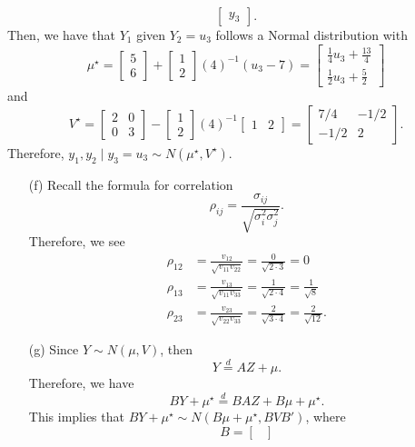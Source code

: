 \documentclass[11pt]{article}
\begin{document}
\begin{itemize}
\begin{itemize}
\[\begin{bmatrix}
y_3
\end{bmatrix}.
\]
Then, we have that $Y_1$ given $Y_2 = u_3$ follows a Normal distribution with
\[
\mu^\star = \begin{bmatrix}
5 \\ 6
\end{bmatrix} + \begin{bmatrix}
1 \\ 2
\end{bmatrix}(4)^{-1}(u_3 - 7) = \begin{bmatrix}
\frac{1}{4}u_3 + \frac{13}{4} \\
\frac{1}{2}u_3 + \frac{5}{2}
\end{bmatrix}
\]
and
\[
V^\star = \begin{bmatrix}
2 & 0 \\
0 & 3
\end{bmatrix} - \begin{bmatrix}
1 \\ 2
\end{bmatrix}(4)^{-1}\begin{bmatrix}
1 & 2
\end{bmatrix} = \begin{bmatrix}
7/4 & -1/2 \\
-1/2 & 2
\end{bmatrix}.
\]
Therefore, $y_1,y_2 \mid y_3 = u_3 \sim N(\mu^\star, V^\star)$.
\end{itemize}
\begin{itemize}
\item[(f)]  Recall the formula for correlation
\[
\rho_{ij} = \frac{\sigma_{ij}}{\sqrt{\sigma^2_i\sigma^2_j}}.
\]
Therefore, we see
\begin{align*}
\rho_{12} &= \frac{v_{12}}{\sqrt{v_{11}v_{22}}} = \frac{0}{\sqrt{2\cdot 3}} = 0 \\
\rho_{13} &= \frac{v_{13}}{\sqrt{v_{11}v_{33}}} = \frac{1}{\sqrt{2\cdot 4}} = \frac{1}{\sqrt{8}} \\
\rho_{23} &= \frac{v_{23}}{\sqrt{v_{22}v_{33}}} = \frac{2}{\sqrt{3\cdot 4}} = \frac{2}{\sqrt{12}}.
\end{align*}
\end{itemize}
\begin{itemize}
\item[(g)]  Since $Y\sim N(\mu, V)$, then
\[
Y \overset{d}{=} AZ + \mu.
\]
Therefore, we have
\[
BY + \mu^\star \overset{d}{=} BAZ + B\mu + \mu^\star.
\]
This implies that $BY + \mu^\star \sim N(B\mu + \mu^\star, BVB')$, where
\[
B = \begin{bmatrix}

\end{bmatrix}\]
\end{itemize}
\end{itemize}
\end{document}
